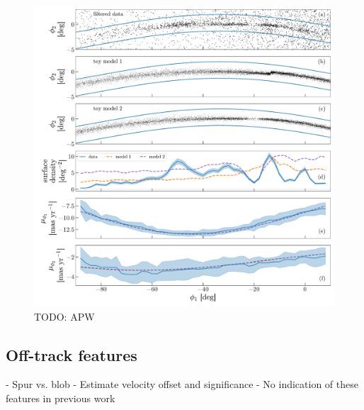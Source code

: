 \documentclass[modern]{aastex62}
\newcommand{\todo}[1]{{\color{red} TODO: #1}}
\begin{document}
\begin{figure}[h]
\begin{center}
\includegraphics[width=\textwidth]{track_observables.pdf}
\end{center}
\caption{%
\todo{APW}
\label{fig:track-and-model}
}
\end{figure}


\subsection{Off-track features}
\label{sec:res_gap}

- Spur vs. blob
- Estimate velocity offset and significance
- No indication of these features in previous work
\end{document}
